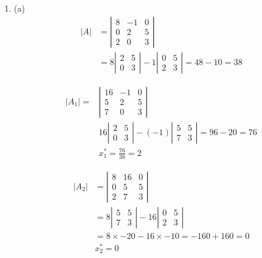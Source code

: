 \begin{enumerate}
\item[3.] (a) \[
\begin{aligned}
|A| & =\left|\begin{array}{rrr}
8 & -1 & 0 \\
0 & 2 & 5 \\
2 & 0 & 3
\end{array}\right| \\
& =8\left|\begin{array}{cc}
2 & 5 \\
0 & 3
\end{array}\right|-1\left|\begin{array}{ll}
0 & 5 \\
2 & 3
\end{array}\right|=48-10=38
\end{aligned}
\]

\[
\begin{aligned}
\left|A_{1}\right|= & \left|\begin{array}{ccc}
16 & -1 & 0 \\
5 & 2 & 5 \\
7 & 0 & 3
\end{array}\right| \\
& 16\left|\begin{array}{cc}
2 & 5 \\
0 & 3
\end{array}\right|-(-1)\left|\begin{array}{rr}
5 & 5 \\
7 & 3
\end{array}\right|=96-20=76 \\
& x_{1}^{*}=\frac{76}{38}=2
\end{aligned}
\]


\[
\begin{aligned}
\left|A_{2}\right| & =\left|\begin{array}{ccc}
8 & 16 & 0 \\
0 & 5 & 5 \\
2 & 7 & 3
\end{array}\right| \\
& =8\left|\begin{array}{cc}
5 & 5 \\
7 & 3
\end{array}\right|-16\left|\begin{array}{cc}
0 & 5 \\
2 & 3
\end{array}\right| \\
& =8 \times-20-16 \times-10=-160+160=0 \\
& x_{2}^{*}=0
\end{aligned}
\]


\end{enumerate}
